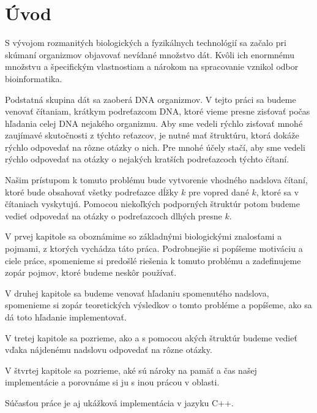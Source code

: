 \chapter*{Úvod}

S vývojom rozmanitých biologických a fyzikálnych technológií sa začalo
pri skúmaní organizmov objavovať nevídané množstvo dát. Kvôli ich
enormnému množstvu a špecifickým vlastnostiam a nárokom na spracovanie
vznikol odbor bioinformatika.

Podstatná skupina dát sa zaoberá DNA organizmov. V tejto práci sa
budeme venovať čítaniam, krátkym podreťazcom DNA, ktoré vieme presne
zisťovať počas hľadania celej DNA nejakého organizmu. Aby sme vedeli
rýchlo zisťovať mnohé zaujímavé skutočnosti z týchto reťazcov, je
nutné mať štruktúru, ktorá dokáže rýchlo odpovedať na rôzne otázky
o nich. Pre mnohé účely stačí, aby sme vedeli rýchlo odpovedať na
otázky o nejakých kratších podreťazcoch týchto čítaní.

Našim prístupom k tomuto problému bude vytvorenie vhodného nadslova
čítaní, ktoré bude obsahovať všetky podreťazce dĺžky $k$ pre vopred dané $k$, ktoré sa
v čítaniach vyskytujú. Pomocou niekoľkých podporných štruktúr potom
budeme vedieť odpovedať na otázky o podreťazcoch dlhých presne $k$.

V prvej kapitole sa oboznámime so základnými biologickými znalosťami a pojmami,
z ktorých vychádza táto práca. Podrobnejšie si popíšeme motiváciu a ciele
práce, spomenieme si predošlé riešenia k tomuto problému a zadefinujeme
zopár pojmov, ktoré budeme neskôr používať.

V druhej kapitole sa budeme venovať hľadaniu spomenutého nadslova,
spomenieme si zopár teoretických výsledkov o tomto probléme
a popíšeme, ako sa dá toto hľadanie implementovať.

V tretej kapitole sa pozrieme, ako a s pomocou akých štruktúr budeme
vedieť vďaka nájdenému nadslovu odpovedať na rôzne otázky.

V štvrtej kapitole sa pozrieme, aké sú nároky na pamäť a čas našej
implementácie a porovnáme si ju s inou prácou v oblasti.

Súčasťou práce je aj ukážková implementácia v jazyku C++.
